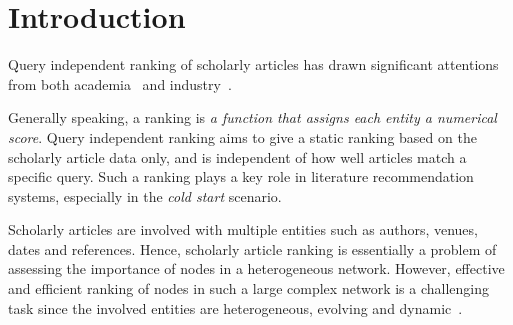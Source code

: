 \section{Introduction}
\label{sec-intro}

Query independent ranking of scholarly articles has drawn significant attentions from both academia~\cite{Garfield471,ChenXMR07,Zhou07-CoRank,ShenAAAI16,Liang16AAAI,Jiang12-MRank,Waltman2014,TanLMGSW16} and industry~\cite{sem-scholar,g-scholar,Sinha15:MAG}. 



Generally speaking, a ranking is {\em a function that assigns each entity a numerical score}. Query independent ranking aims to give a static ranking based on the scholarly article data only, and is independent of how well articles match a specific query. Such a ranking plays a key role in literature recommendation systems, especially in the {\em cold start} scenario.

Scholarly articles are involved with multiple entities such as authors, venues, dates and references. Hence, scholarly article ranking is essentially a problem of assessing the importance of nodes in a heterogeneous network.
However, effective and efficient ranking of nodes in such a large complex network is a challenging task since the involved entities
are heterogeneous, evolving and dynamic~\cite{AggarwalS14-survey,fcs-biggraph}.



